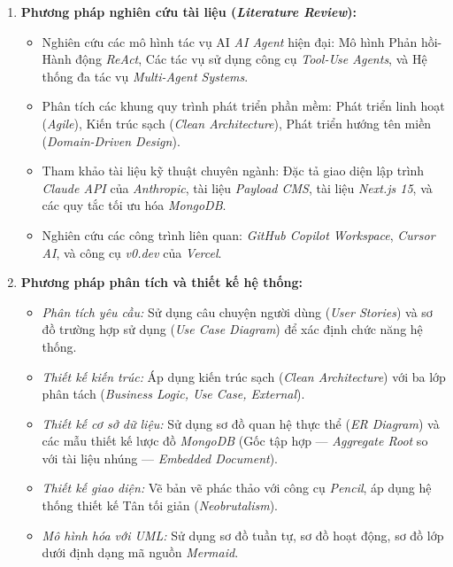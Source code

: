 \documentclass[13pt,a4paper,oneside]{extreport}
\numberwithin{equation}{chapter}
\numberwithin{figure}{chapter}
\numberwithin{table}{chapter}
\begin{document}
\begin{enumerate}
    \item \textbf{Phương pháp nghiên cứu tài liệu (\textit{Literature Review}):}
    \begin{itemize}
        \item Nghiên cứu các mô hình tác vụ AI \textit{AI Agent} hiện đại: Mô hình Phản hồi-Hành động \textit{ReAct}, Các tác vụ sử dụng công cụ \textit{Tool-Use Agents}, và Hệ thống đa tác vụ \textit{Multi-Agent Systems}.
        \item Phân tích các khung quy trình phát triển phần mềm: Phát triển linh hoạt (\textit{Agile}), Kiến trúc sạch (\textit{Clean Architecture}), Phát triển hướng tên miền (\textit{Domain-Driven Design}).
        \item Tham khảo tài liệu kỹ thuật chuyên ngành: Đặc tả giao diện lập trình \textit{Claude API} của \textit{Anthropic}, tài liệu \textit{Payload CMS}, tài liệu \textit{Next.js 15}, và các quy tắc tối ưu hóa \textit{MongoDB}.
        \item Nghiên cứu các công trình liên quan: \textit{GitHub Copilot Workspace}, \textit{Cursor AI}, và công cụ \textit{v0.dev} của \textit{Vercel}.
    \end{itemize}

    \item \textbf{Phương pháp phân tích và thiết kế hệ thống:}
    \begin{itemize}
        \item \textit{Phân tích yêu cầu:} Sử dụng câu chuyện người dùng (\textit{User Stories}) và sơ đồ trường hợp sử dụng (\textit{Use Case Diagram}) để xác định chức năng hệ thống.
        \item \textit{Thiết kế kiến trúc:} Áp dụng kiến trúc sạch (\textit{Clean Architecture}) với ba lớp phân tách (\textit{Business Logic, Use Case, External}).
        \item \textit{Thiết kế cơ sở dữ liệu:} Sử dụng sơ đồ quan hệ thực thể (\textit{ER Diagram}) và các mẫu thiết kế lược đồ \textit{MongoDB} (Gốc tập hợp — \textit{Aggregate Root} so với tài liệu nhúng — \textit{Embedded Document}).
        \item \textit{Thiết kế giao diện:} Vẽ bản vẽ phác thảo với công cụ \textit{Pencil}, áp dụng hệ thống thiết kế Tân tối giản (\textit{Neobrutalism}).
        \item \textit{Mô hình hóa với UML:} Sử dụng sơ đồ tuần tự, sơ đồ hoạt động, sơ đồ lớp dưới định dạng mã nguồn \textit{Mermaid}.
    \end{itemize}


\end{enumerate}
\end{document}
